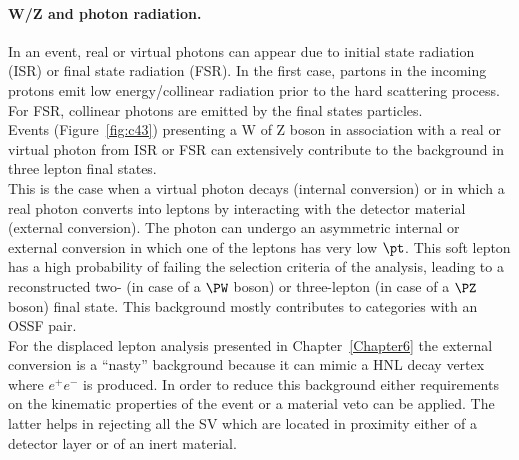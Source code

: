 \paragraph{W/Z and photon radiation.}\label{sec:c4photon}
In an event, real or virtual photons can appear due to initial state
radiation (ISR) or final state radiation (FSR). In the first case,
partons in the incoming protons emit low energy/collinear radiation
prior to the hard scattering process. For FSR, collinear photons are emitted by
the final states particles.\\
Events (Figure~\ref{fig:c43}) presenting a W of Z boson in association with a real or virtual
photon from ISR or FSR can extensively contribute to
the background in three lepton final states.\\
This is the case when a virtual photon decays (internal
conversion) or in which a real photon converts into leptons by interacting with the detector material
(external conversion). The photon can undergo an
asymmetric internal or external conversion in which one of the leptons
has very low $\pt$. This soft lepton has a high probability of failing
the selection criteria of the analysis, leading to a reconstructed
two- (in case of a $\PW$ boson) or three-lepton (in case of a $\PZ$
boson) final state. This background mostly contributes to categories
with an OSSF pair.\\
For the displaced lepton analysis presented in Chapter~\ref{Chapter6}
the external conversion is a ``nasty'' background because it can mimic
a HNL decay vertex where $e^{+}e^{-}$ is produced. In order
to reduce this background either requirements on the kinematic
properties of the event or a material veto can be applied. The latter
helps in rejecting all the SV
which are located in proximity either of a detector layer or of an inert material.

